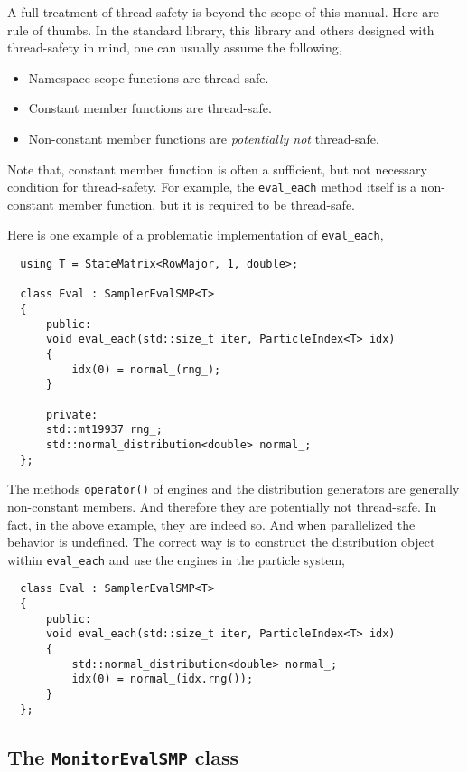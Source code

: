 A full treatment of thread-safety is beyond the scope of this manual. Here are
rule of thumbs. In the standard library, this library and others designed with
thread-safety in mind, one can usually assume the following,
\begin{itemize}
  \item Namespace scope functions are thread-safe.
  \item Constant member functions are thread-safe.
  \item Non-constant member functions are \emph{potentially not} thread-safe.
\end{itemize}
Note that, constant member function is often a sufficient, but not necessary
condition for thread-safety. For example, the \verb|eval_each| method itself is
a non-constant member function, but it is required to be thread-safe.

Here is one example of a problematic implementation of \verb|eval_each|,
\begin{Verbatim}
  using T = StateMatrix<RowMajor, 1, double>;

  class Eval : SamplerEvalSMP<T>
  {
      public:
      void eval_each(std::size_t iter, ParticleIndex<T> idx)
      {
          idx(0) = normal_(rng_);
      }

      private:
      std::mt19937 rng_;
      std::normal_distribution<double> normal_;
  };
\end{Verbatim}
The methods \verb|operator()| of \rng engines and the distribution generators
are generally non-constant members. And therefore they are potentially not
thread-safe. In fact, in the above example, they are indeed so. And when
parallelized the behavior is undefined. The correct way is to construct the
distribution object within \verb|eval_each| and use the \rng engines in the
particle system,
\begin{Verbatim}
  class Eval : SamplerEvalSMP<T>
  {
      public:
      void eval_each(std::size_t iter, ParticleIndex<T> idx)
      {
          std::normal_distribution<double> normal_;
          idx(0) = normal_(idx.rng());
      }
  };
\end{Verbatim}

\subsection{The \texttt{MonitorEvalSMP} class}
\label{sub:he MonitorEvalSMP class}

